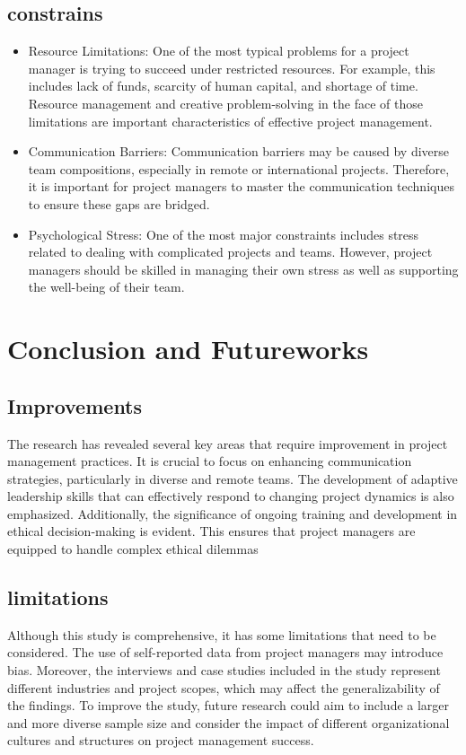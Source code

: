 \documentclass{article}
\begin{document}
\subsection{constrains}
\begin{itemize}
    \item Resource Limitations: One of the most typical problems for a project manager is trying to succeed under restricted resources. For example, this includes lack of funds, scarcity of human capital, and shortage of time. Resource management and creative problem-solving in the face of those limitations are important characteristics of effective project management\cite{relationship_between_project_manage}.
    \item Communication Barriers: Communication barriers may be caused by diverse team compositions, especially in remote or international projects. Therefore, it is important for project managers to master the communication techniques to ensure these gaps are bridged\cite{Warner_Mark}.
    \item Psychological Stress: One of the most major constraints includes stress related to dealing with complicated projects and teams. However, project managers should be skilled in managing their own stress as well as supporting the well-being of their team\cite{Project_Management_Techniques}.
\end{itemize}

\newpage
\section{Conclusion and Futureworks}
\subsection{Improvements}
The research has revealed several key areas that require improvement in project management practices. It is crucial to focus on enhancing communication strategies, particularly in diverse and remote teams. The development of adaptive leadership skills that can effectively respond to changing project dynamics is also emphasized. Additionally, the significance of ongoing training and development in ethical decision-making is evident. This ensures that project managers are equipped to handle complex ethical dilemmas\cite{Warner_Mark}

\subsection{limitations}
Although this study is comprehensive, it has some limitations that need to be considered. The use of self-reported data from project managers may introduce bias. Moreover, the interviews and case studies included in the study represent different industries and project scopes, which may affect the generalizability of the findings. To improve the study, future research could aim to include a larger and more diverse sample size and consider the impact of different organizational cultures and structures on project management success\cite{Project_Management_Techniques}.
\end{document}
